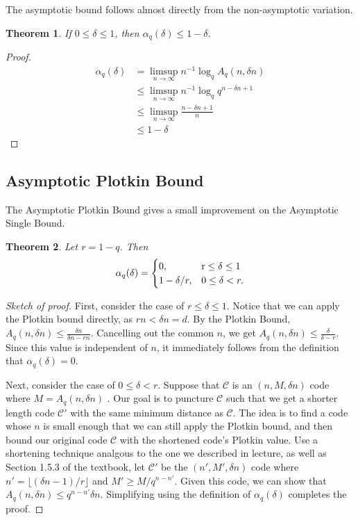 \documentclass{article}
\theoremstyle{plain}
\newtheorem{theorem}{Theorem}[section]
\theoremstyle{definition}
\begin{document}
The asymptotic bound follows almost directly from the non-asymptotic variation.

\begin{theorem}
If $0 \le \delta \le 1$, then $\alpha_q(\delta) \le 1 - \delta$.
\end{theorem} 


\begin{proof}
\begin{equation} 
\begin{split}
\alpha_{q}(\delta) & = \limsup_{n \to \infty} n^{-1} \log_q A_q(n,\delta n) \\
& \le \limsup_{n \to \infty} n^{-1} \log_q q^{n-\delta n+1} \\
& \le \limsup_{n \to \infty} \frac{n-\delta n+1}{n} \\
& \le 1 - \delta
\end{split}
\end{equation}
\end{proof}

\subsection{Asymptotic Plotkin Bound}
The Asymptotic Plotkin Bound gives a small improvement on the Asymptotic Single Bound.  

\begin{theorem}
Let $r=1-q$.  Then 
\begin{equation*}
\alpha_q(\delta)= 
\begin{cases} 0, &\mbox r\le\delta\le1 \\ 1-\delta/r, &\mbox{} 0\le\delta < r. \end{cases}
\end{equation*}
\end{theorem}

\begin{proof}[Sketch of proof]
First, consider the case of $r\le\delta\le1$.  Notice that we can apply the Plotkin bound directly, as $rn < \delta n = d$.  By the Plotkin Bound, $A_q(n,\delta n) \le \frac{\delta n}{\delta n - rn}$.  Cancelling
out the common $n$, we get $A_q(n,\delta n) \le \frac{\delta}{\delta - r}$.  Since this value is independent of $n$, it immediately follows from the definition that $\alpha_q(\delta)=0$.

Next, consider the case of $0\le\delta < r$.  Suppose that $\mathcal{C}$ is an $(n,M,\delta n)$ code where $M=A_q(n,\delta n)$ .  Our goal is to puncture $\mathcal{C}$ such that 
we get a shorter length code $\mathcal{C}'$ with the same minimum distance as $\mathcal{C}$.  The idea is to find a code whose $n$ is small enough that we can still apply the Plotkin bound, and then bound
our original code $\mathcal{C}$ with the shortened code's Plotkin value.
Use a shortening technique analgous to the one we described in lecture, as well as Section 1.5.3 of the textbook,
let $\mathcal{C}'$ be the $(n',M',\delta n)$ code where $n' = \lfloor (\delta n -1)/ r \rfloor$ and $M' \ge M/q^{n-n'}$.  Given this code, we can show that $A_q(n,\delta n) \le q^{n-n'} \delta n$.
Simplifying using the definition of $\alpha_q(\delta)$ completes the proof.
\end{proof}
\end{document}
